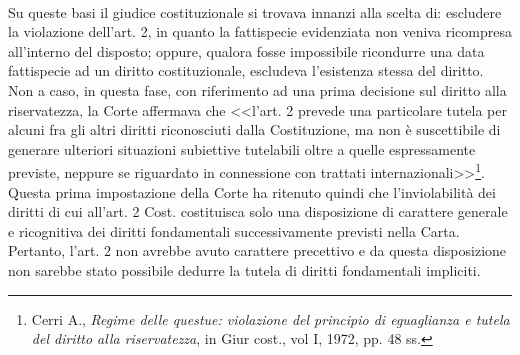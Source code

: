 \\Su queste basi il giudice costituzionale si trovava innanzi alla scelta di: escludere la violazione dell’art. 2, in quanto la fattispecie evidenziata non veniva ricompresa all'interno del disposto; oppure, qualora fosse impossibile ricondurre una data fattispecie ad un diritto costituzionale, escludeva l’esistenza stessa del diritto.
\\Non a caso, in questa fase, con riferimento ad una prima decisione sul diritto alla riservatezza, la Corte affermava che <<l’art. 2 prevede una particolare tutela per alcuni fra gli altri diritti riconosciuti dalla Costituzione, ma non è suscettibile di generare ulteriori situazioni subiettive tutelabili oltre a quelle espressamente previste, neppure se riguardato in connessione con trattati internazionali>>\footnote{Cerri A., \textit{Regime delle questue: violazione del principio di eguaglianza e tutela del diritto alla riservatezza}, in Giur cost., vol I, 1972, pp. 48 ss.}.
\\Questa prima impostazione della Corte ha ritenuto quindi che l’inviolabilità dei diritti di cui all’art. 2 Cost. costituisca solo una disposizione di carattere generale e ricognitiva dei diritti fondamentali successivamente previsti nella Carta. 
Pertanto, l’art. 2 non avrebbe avuto carattere precettivo e da questa disposizione non sarebbe stato possibile dedurre la tutela di diritti fondamentali impliciti.
